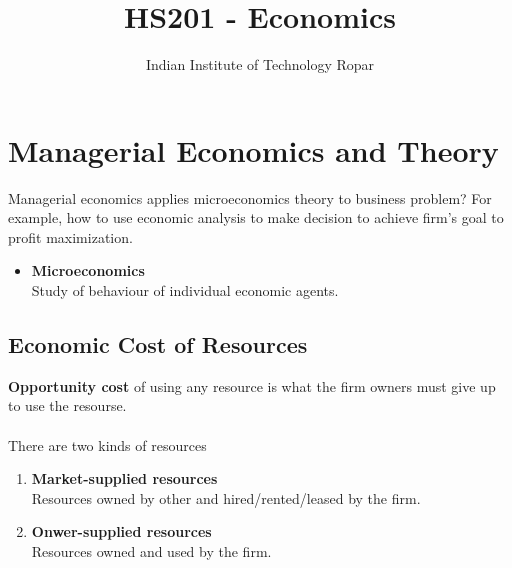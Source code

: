 \documentclass[oneside]{book}
\title{HS201 - Economics}
\author{Indian Institute of Technology Ropar}
\begin{document}
\maketitle
{
	\hypersetup{
		hidelinks
	}
	\tableofcontents
}
\renewcommand{\arraystretch}{1.5}%

\chapter{Managerial Economics and Theory}
Managerial economics applies microeconomics theory to business problem? For example, how to use economic analysis to make decision to achieve firm's goal to profit maximization.
\begin{itemize}
	\item \textbf{Microeconomics}\\
	      Study of behaviour of individual economic agents.
\end{itemize}
\section{Economic Cost of Resources}
\textbf{Opportunity cost} of using any resource is what the firm owners must give up to use the resourse.
\\\\
\noindent There are two kinds of resources
\begin{enumerate}
	\item \textbf{Market-supplied resources}\\
	      Resources owned by other and hired/rented/leased by the firm.
	\item \textbf{Onwer-supplied resources}\\
	      Resources owned and used by the firm.
\end{enumerate}
\end{document}

